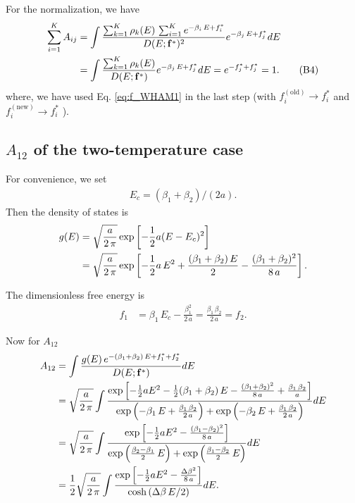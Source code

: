 \documentclass[aip,jcp,preprint,notitlepage, superscriptaddress]{revtex4-1}
\begin{document}
For the normalization, we have
\begin{align}
\sum_{i = 1}^K
A_{ij}
&=
\int
\frac
{
  \sum_{k=1}^K \rho_k(E) \,
  \sum_{i = 1}^K e^{-\beta_i \, E + f_i^*}
}
{
  D(E; \mathbf{f}^*)^2
}
e^{-\beta_j \, E + f_j^*}
dE
\notag \\
&=
\int
\frac
{
  \sum_{k=1}^K \rho_k(E)
}
{
  D(E; \mathbf{f}^*)
}
e^{-\beta_j \, E + f_j^*}
dE
=
e^{-f_j^* + f_j^*} = 1.
\tag{B4}
\label{eq:Aij_normalization}
\end{align}
%
where,
we have used Eq. \eqref{eq:f_WHAM1}
in the last step
(with
$f_i^\mathrm{(old)} \rightarrow f_i^*$
and
$f_i^\mathrm{(new)} \rightarrow f_i^*$
).




\subsection{$A_{12}$ of the two-temperature case}


For convenience,
we set
\begin{align}
  E_c = (\beta_1 + \beta_2)/(2a).
  \label{eq:Ec_twoT}
\end{align}
%
Then the density of states is
%
\begin{align}
g(E)
&=
\sqrt{ \frac a { 2 \, \pi } }
\exp
\left[
  -\frac 1 2 a
  (E - E_c)^2
\right]
\notag \\
&=
\sqrt{ \frac a { 2 \, \pi } }
\exp
\left[
  -\frac 1 2 a \, E^2
  + \frac{
    (\beta_1 + \beta_2) \, E
  }{2}
  - \frac{
    (\beta_1 + \beta_2)^2
  }{ 8 \, a }
\right].
\end{align}


The dimensionless free energy is
%
\begin{align}
f_1
&=
\beta_1 \, E_c
- \frac{ \beta_1^2 } { 2 \, a }
=
\frac{\beta_1 \, \beta_2 } { 2 \, a }
= f_2.
\end{align}



Now for $A_{12}$
\begin{align}
A_{12}
&=
\int
\frac
{
  g(E) \, e^{ -(\beta_1 + \beta_2) \, E + f_1^* + f_2^*}
}
{
  D(E; \mathbf{f}^*)
}
dE
\notag \\
&=
\sqrt{ \frac a { 2 \, \pi } }
\int
\frac
{
  \exp\left[
    -\frac 1 2 a E^2
    - \frac 1 2 (\beta_1 + \beta_2) \, E
    - \frac{
      (\beta_1 + \beta_2)^2
    }{ 8 \, a }
    +
    \frac{ \beta_1 \, \beta_2 } { a }
  \right]
}
{
  \exp\left(
    -\beta_1 \, E
    + \frac{\beta_1 \, \beta_2}{2 \, a}
  \right)
  +
  \exp\left(
    -\beta_2 \, E
    + \frac{\beta_1 \, \beta_2}{2 \, a}
  \right)
}
dE
\notag \\
&=
\sqrt{ \frac a { 2 \, \pi } }
\int
\frac
{
  \exp\left[
    -\frac 1 2 a E^2
    - \frac{
      (\beta_1 - \beta_2)^2
    }{ 8 \, a }
  \right]
}
{
  \exp\left(
    \frac{ \beta_2 - \beta_1 } {2 } \, E
  \right)
  +
  \exp\left(
    \frac{ \beta_1 - \beta_2 } {2 } \, E
  \right)
}
dE
\notag \\
&=
\frac 1 2
\sqrt{ \frac a { 2 \, \pi } }
\int
\frac
{
  \exp\left[
    -\frac 1 2 a E^2
    - \frac{
      \Delta \beta^2
    }{ 8 \, a }
  \right]
}
{
  \cosh\left(
    \Delta \beta \, E / 2
  \right)
}
dE.
\label{eq:A12}
\end{align}
\end{document}
